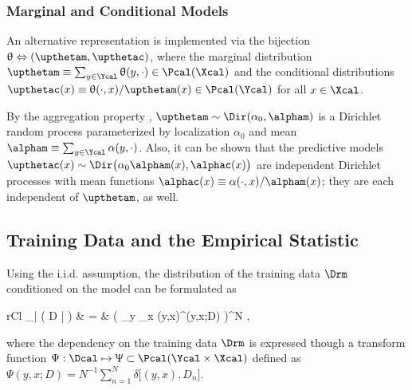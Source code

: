\documentclass{article}
\begin{document}
	
	
	\subsubsection{Marginal and Conditional Models} \label{sec:P_theta_mc}
	
	An alternative representation is implemented via the bijection $\uptheta \Leftrightarrow (\upthetam,\upthetac)$, where the marginal distribution $\upthetam \equiv \sum_{y \in \Ycal} \uptheta(y,\cdot) \in \Pcal(\Xcal)$ and the conditional distributions $\upthetac(x) \equiv \uptheta(\cdot,x) / \upthetam(x) \in \Pcal(\Ycal)$ for all $x \in \Xcal$. 
	
	By the aggregation property \cite{ferguson}, $\upthetam \sim \Dir(\alpha_0,\alpham)$ is a Dirichlet random process parameterized by localization $\alpha_0$ and mean $\alpham \equiv \sum_{y \in \Ycal} \alpha(y,\cdot)$. Also, it can be shown that the predictive models $\upthetac(x) \sim \Dir\big(\alpha_0 \alpham(x),\alphac(x)\big)$ are independent Dirichlet processes with mean functions $\alphac(x) \equiv \alpha(\cdot,x) / \alpham(x)$; they are each independent of $\upthetam$, as well. 
	
	
	
	
	
	
	
	\subsection{Training Data and the Empirical Statistic}
	
	Using the i.i.d. assumption, the distribution of the training data $\Drm$ conditioned on the model can be formulated as
	\begin{IEEEeqnarray}{rCl}
		\Prm_{\Drm | \uptheta}\big( D | \theta \big) & = & \left( \prod_{y \in \Ycal} \prod_{x \in \Xcal} \theta(y,x)^{\Psi(y,x;D)} \right)^N \;,
	\end{IEEEeqnarray}
	where the dependency on the training data $\Drm$ is expressed though a transform function $\Psi : \Dcal \mapsto \Uppsi \subset \Pcal(\Ycal \times \Xcal)$ defined as $\Psi(y,x;D) = N^{-1} \sum_{n=1}^N \delta \big[ (y,x),D_n \big]$. 
	
	
	
\end{document}

